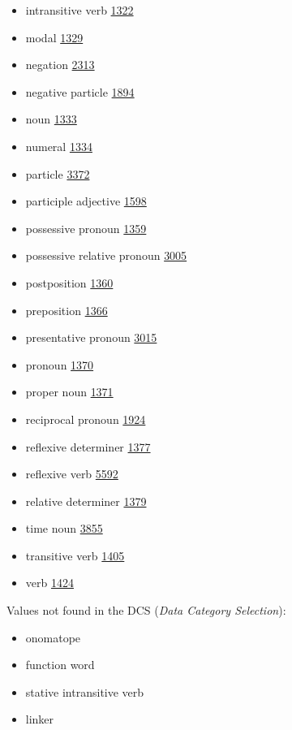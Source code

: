 \documentclass[a4paper,12pt]{article}
\begin{document}
\begin{itemize}
\item intransitive verb \href{http://www.isocat.org/datcat/DC-1322}{1322}
\item modal \href{http://www.isocat.org/datcat/DC-1329}{1329}
\item negation \href{http://www.isocat.org/datcat/DC-2313}{2313}
\item negative particle \href{http://www.isocat.org/datcat/DC-1894}{1894}
\item noun \href{http://www.isocat.org/datcat/DC-1333}{1333}
\item numeral \href{http://www.isocat.org/datcat/DC-1334}{1334}
\item particle \href{http://www.isocat.org/datcat/DC-3372}{3372}
\item participle adjective \href{http://www.isocat.org/datcat/DC-1598}{1598}
\item possessive pronoun \href{http://www.isocat.org/datcat/DC-1359}{1359}
\item possessive relative pronoun \href{http://www.isocat.org/datcat/DC-3005}{3005}
\item postposition \href{http://www.isocat.org/datcat/DC-1360}{1360}
\item preposition \href{http://www.isocat.org/datcat/DC-1366}{1366}
\item presentative pronoun \href{http://www.isocat.org/datcat/DC-3015}{3015}
\item pronoun \href{http://www.isocat.org/datcat/DC-1370}{1370}
\item proper noun \href{http://www.isocat.org/datcat/DC-1371}{1371}
\item reciprocal pronoun \href{http://www.isocat.org/datcat/DC-1924}{1924}
\item reflexive determiner \href{http://www.isocat.org/datcat/DC-1377}{1377}
\item reflexive verb \href{http://www.isocat.org/datcat/DC-5592}{5592}
\item relative determiner \href{http://www.isocat.org/datcat/DC-1379}{1379}
\item time noun \href{http://www.isocat.org/datcat/DC-3855}{3855}
\item transitive verb \href{http://www.isocat.org/datcat/DC-1405}{1405}
\item verb \href{http://www.isocat.org/datcat/DC-1424}{1424}
\end{itemize}
Values not found in the DCS (\textit{Data Category Selection}):
\begin{itemize}
\item onomatope
\item function word
\item stative intransitive verb
\item linker
\end{itemize}
\end{document}
